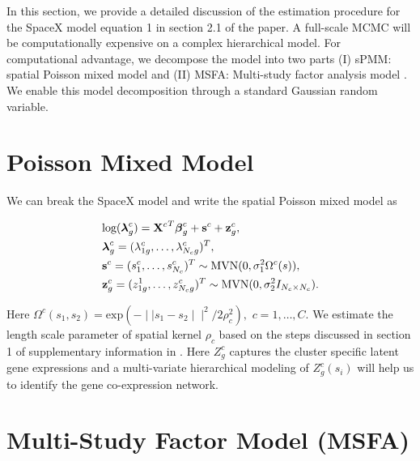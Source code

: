 \documentclass[
]{book}
\begin{document}
In this section, we provide a detailed discussion of the estimation procedure for the SpaceX model equation 1 in section 2.1 of the paper. A full-scale MCMC will be computationally expensive on a complex hierarchical model. For computational advantage, we decompose the model into two parts (I) sPMM: spatial Poisson mixed model \citep{sun2017differential} and (II) MSFA: Multi-study factor analysis model \citep{de2018bayesian}. We enable this model decomposition through a standard Gaussian random variable.

\hypertarget{poisson-mixed-model}{%
\section{Poisson Mixed Model}\label{poisson-mixed-model}}

We can break the SpaceX model and write the spatial Poisson mixed model as

\begin{align}
\begin{split}
& \text{log}({\boldsymbol \lambda}^{c}_{g}) = {{\bf X}^{c}}^{T} {\boldsymbol \beta}^{c}_{g} + {\bf s}^{c} + {\bf z}^{c}_{g}, \\
& {\boldsymbol \lambda}^{c}_{g} = ( \lambda^{c}_{1g}, \dots , \lambda^{c}_{N_{c}g} )^{T}, \\
&{\bf s}^{c} = ( s^{c}_{1}, \dots , s^{c}_{N_{c}} )^{T} \sim \text{MVN}(0, \sigma_{1}^{2}\Omega^{c}(s)), \\
&{\bf z}^{c}_{g} = (z^{1}_{1g}, \dots , z^{c}_{N_{c}g})^{T} \sim \text{MVN}(0, \sigma_{2}^{2} I_{N_{c} \times N_{c} }).
\end{split}
\label{eq:PMM-supp}
\end{align}

Here \(\Omega^{c}(s_{1}, s_{2}) = \text{exp} (- \mid \mid s_{1} - s_{2} \mid \mid^{2} / 2 \rho^{2}_{c} ),\) \(c = 1, \dots, C\). We estimate the length scale parameter of spatial kernel \(\rho_{c}\) based on the steps discussed in section 1 of supplementary information in \citet{sun2017differential}. Here \(Z^{c}_{g}\) captures the cluster specific latent gene expressions and a multi-variate hierarchical modeling of \(Z^{c}_{g}(s_{i})\) will help us to identify the gene co-expression network.

\hypertarget{multi-study-factor-model-msfa}{%
\section{Multi-Study Factor Model (MSFA)}\label{multi-study-factor-model-msfa}}
\end{document}
